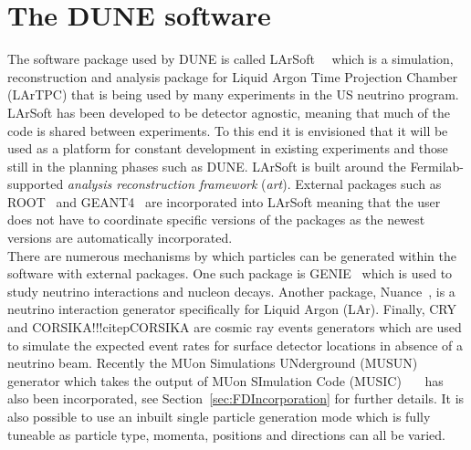 \section{The DUNE software} \label{sec:LArSoft} %
The software package used by DUNE is called LArSoft~\citep{Church_LArSoft}~\citep{LArSoftOrg} which is a simulation, reconstruction and analysis package for Liquid Argon Time Projection Chamber (LArTPC) that is being used by many experiments in the US neutrino program. LArSoft has been developed to be detector agnostic, meaning that much of the code is shared between experiments. To this end it is envisioned that it will be used as a platform for constant development in existing experiments and those still in the planning phases such as DUNE. LArSoft is built around the Fermilab-supported \emph{analysis reconstruction framework} (\emph{art}). External packages such as ROOT~\citep{ROOT} and GEANT4~\citep{GEANT4} are incorporated into LArSoft meaning that the user does not have to coordinate specific versions of the packages as the newest versions are automatically incorporated. \\

There are numerous mechanisms by which particles can be generated within the software with external packages. One such package is GENIE~\citep{GENIE} which is used to study neutrino interactions and nucleon decays. Another package, Nuance~\citep{Nuance}, is a neutrino interaction generator specifically for Liquid Argon (LAr). Finally, CRY~\citep{CRY} and CORSIKA!!!citep{CORSIKA} are cosmic ray events generators which are used to simulate the expected event rates for surface detector locations in absence of a neutrino beam. Recently the MUon Simulations UNderground (MUSUN)~\citep{MUSUN}~\citep{MUSUN2} generator which takes the output of MUon SImulation Code (MUSIC)~\citep{MUSUN}~\citep{MUSIC}~\citep{MUSIC2} has also been incorporated, see Section~\ref{sec:FDIncorporation} for further details. It is also possible to use an inbuilt single particle generation mode which is fully tuneable as particle type, momenta, positions and directions can all be varied. \\

